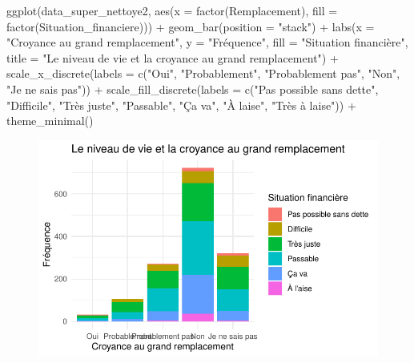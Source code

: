 \documentclass[
  letterpaper,
  DIV=11,
  numbers=noendperiod]{scrartcl}
\newenvironment{Shaded}{\begin{snugshade}}{\end{snugshade}}
\newcommand{\AttributeTok}[1]{\textcolor[rgb]{0.40,0.45,0.13}{#1}}
\newcommand{\FunctionTok}[1]{\textcolor[rgb]{0.28,0.35,0.67}{#1}}
\newcommand{\NormalTok}[1]{\textcolor[rgb]{0.00,0.23,0.31}{#1}}
\newcommand{\SpecialCharTok}[1]{\textcolor[rgb]{0.37,0.37,0.37}{#1}}
\newcommand{\StringTok}[1]{\textcolor[rgb]{0.13,0.47,0.30}{#1}}
\begin{document}
\begin{Shaded}
\begin{Highlighting}[]
\FunctionTok{ggplot}\NormalTok{(data\_super\_nettoye2, }\FunctionTok{aes}\NormalTok{(}\AttributeTok{x =} \FunctionTok{factor}\NormalTok{(Remplacement), }\AttributeTok{fill =} \FunctionTok{factor}\NormalTok{(Situation\_financiere))) }\SpecialCharTok{+}
  \FunctionTok{geom\_bar}\NormalTok{(}\AttributeTok{position =} \StringTok{"stack"}\NormalTok{) }\SpecialCharTok{+}
  \FunctionTok{labs}\NormalTok{(}\AttributeTok{x =} \StringTok{"Croyance au grand remplacement"}\NormalTok{, }\AttributeTok{y =} \StringTok{"Fréquence"}\NormalTok{, }\AttributeTok{fill =} \StringTok{"Situation financière"}\NormalTok{, }\AttributeTok{title =} \StringTok{"Le niveau de vie et la croyance au grand remplacement"}\NormalTok{) }\SpecialCharTok{+}
  \FunctionTok{scale\_x\_discrete}\NormalTok{(}\AttributeTok{labels =} \FunctionTok{c}\NormalTok{(}\StringTok{"Oui"}\NormalTok{, }\StringTok{"Probablement"}\NormalTok{, }\StringTok{"Probablement pas"}\NormalTok{, }\StringTok{"Non"}\NormalTok{, }\StringTok{"Je ne sais pas"}\NormalTok{)) }\SpecialCharTok{+}
  \FunctionTok{scale\_fill\_discrete}\NormalTok{(}\AttributeTok{labels =} \FunctionTok{c}\NormalTok{(}\StringTok{"Pas possible sans dette"}\NormalTok{, }\StringTok{"Difficile"}\NormalTok{, }\StringTok{"Très juste"}\NormalTok{, }\StringTok{"Passable"}\NormalTok{, }\StringTok{"Ça va"}\NormalTok{, }\StringTok{"À l\textquotesingle{}aise"}\NormalTok{, }\StringTok{"Très à l\textquotesingle{}aise"}\NormalTok{)) }\SpecialCharTok{+}
  \FunctionTok{theme\_minimal}\NormalTok{()}
\end{Highlighting}
\end{Shaded}

\begin{figure}[H]

{\centering \includegraphics{travail_session_Akyildiz_files/figure-pdf/unnamed-chunk-6-1.pdf}

}

\end{figure}
\end{document}
